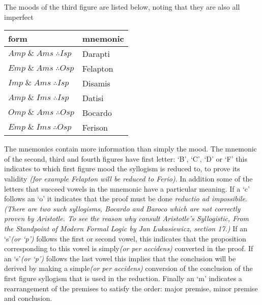 \documentclass[12pt]{article}
\begin{document}
The moods of the third figure are listed below, noting that they are also all imperfect
\begin{center}
\begin{tabular}{l l}
\textbf{form} & \textbf{mnemonic}\\
\hline
$Amp \;\&\; Ams\;\therefore Isp$ & Darapti\\
$Emp \;\&\; Ams\;\therefore Osp$ & Felapton\\
$Imp \;\&\; Ams\;\therefore Isp$ & Disamis\\
$Amp \;\&\; Ims\;\therefore Isp$ & Datisi\\
$Omp \;\&\; Ams\;\therefore Osp$ & Bocardo\\
$Emp \;\&\; Ims\;\therefore Osp$ & Ferison
\end{tabular}
\end{center}
The mnemonics contain more information than simply the mood.  The mnemonic of the second, third and fourth figures have first letter: `B', `C', `D' or `F' this indicates to which first figure mood the syllogism is reduced to, to prove its validity \textit{(for example Felapton will be reduced to Ferio)}.  In addition  some of the letters that succeed vowels in the mnemonic have a particular meaning.  If a `c' follows an `o' it indicates that the proof must be done \emph{reductio ad impossibile}.\textit{(There are two such syllogisms, Bocardo and Baroco which are not correctly proven by Aristotle.  To see the reason why consult Aristotle's Syllogistic, From the Standpoint of Modern Formal Logic by Jan Lukasiewicz, section 17.)}  If an `s'\textit{(or `p')} follows the first or second vowel, this indicates that the proposition corresponding to this vowel is simply\textit{(or per accidens)} converted in the proof.  If an `s'\textit{(or `p')} follows the last vowel this implies that the conclusion  will be derived by making a simple\textit{(or per accidens)} conversion of the conclusion of the first figure syllogism that is used in the reduction.  Finally an `m' indicates a rearrangement of the premises to satisfy the order: major premise, minor premise and conclusion.\cite{PH}
\end{document}
